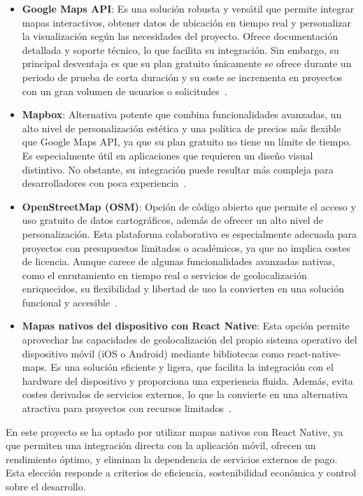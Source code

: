 \begin{itemize}
    \item \textbf{Google Maps API}: Es una solución robusta y versátil que permite integrar mapas interactivos, obtener datos de ubicación en tiempo real y personalizar la visualización según las necesidades del proyecto. Ofrece documentación detallada y soporte técnico, lo que facilita su integración. Sin embargo, su principal desventaja es que su plan gratuito únicamente se ofrece durante un periodo de prueba de corta duración y su coste se incrementa en proyectos con un gran volumen de usuarios o solicitudes~\cite{googlemaps2024}.
    \item \textbf{Mapbox}: Alternativa potente que combina funcionalidades avanzadas, un alto nivel de personalización estética y una política de precios más flexible que Google Maps API, ya que su plan gratuito no tiene un límite de tiempo. Es especialmente útil en aplicaciones que requieren un diseño visual distintivo. No obstante, su integración puede resultar más compleja para desarrolladores con poca experiencia~\cite{mapbox2024}.
    \item \textbf{OpenStreetMap (OSM)}: Opción de código abierto que permite el acceso y uso gratuito de datos cartográficos, además de ofrecer un alto nivel de personalización. Esta plataforma colaborativa es especialmente adecuada para proyectos con presupuestos limitados o académicos, ya que no implica costes de licencia. Aunque carece de algunas funcionalidades avanzadas nativas, como el enrutamiento en tiempo real o servicios de geolocalización enriquecidos, su flexibilidad y libertad de uso la convierten en una solución funcional y accesible~\cite{osm2024}.
    \item \textbf{Mapas nativos del dispositivo con React Native}: Esta opción permite aprovechar las capacidades de geolocalización del propio sistema operativo del dispositivo móvil (iOS o Android) mediante bibliotecas como react-native-maps. Es una solución eficiente y ligera, que facilita la integración con el hardware del dispositivo y proporciona una experiencia fluida. Además, evita costes derivados de servicios externos, lo que la convierte en una alternativa atractiva para proyectos con recursos limitados~\cite{reactnativemaps2024}.
\end{itemize}

En este proyecto se ha optado por utilizar mapas nativos con React Native, ya que permiten una integración directa con la aplicación móvil, ofrecen un rendimiento óptimo, y eliminan la dependencia de servicios externos de pago. Esta elección responde a criterios de eficiencia, sostenibilidad económica y control sobre el desarrollo.

